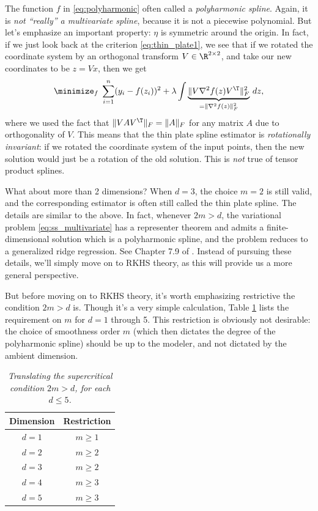 \documentclass{article}
\begin{document}
The function $f$ in \eqref{eq:polyharmonic} often called a \emph{polyharmonic
  spline}. Again, it is \emph{not ``really'' a multivariate spline}, because it
is not a piecewise polynomial. But let's emphasize an important property: $\eta$
is symmetric around the origin. In fact, if we just look back at the criterion
\eqref{eq:thin_plate1}, we see that if we rotated the coordinate system by an
orthogonal transform $V \in \R^{2 \times 2}$, and take our new coordinates to be
$z=Vx$, then we get  
\[
\minimize_f \; \sum_{i=1}^n (y_i - f(z_i))^2 + \lambda \int \underbrace{\| V
  \nabla^2 f(z) V^\T\|_F^2}_{= \|\nabla^2 f(z)\|_F^2} \, dz,   
\]
where we used the fact that $\|V A V^\T\|_F = \|A\|_F$ for any matrix $A$ due to
orthogonality of $V$. This means that the thin plate spline estimator is
\emph{rotationally invariant}: if we rotated the coordinate system of the input
points, then the new solution would just be a rotation of the old solution. This
is \emph{not} true of tensor product splines. 

What about more than 2 dimensions? When $d=3$, the choice $m=2$ is still
valid, and the corresponding estimator is often still called the thin plate
spline. The details are similar to the above. In fact, whenever $2m > d$, the 
variational problem \eqref{eq:ss_multivariate} has a representer theorem and
admits a finite-dimensional solution which is a polyharmonic spline, and the
problem reduces to a generalized ridge regression. See Chapter 7.9 of
\citet{green1993nonparametric}. Instead of pursuing these details, we'll simply
move on to RKHS theory, as this will provide us a more general perspective. 

But before moving on to RKHS theory, it's worth emphasizing restrictive the 
condition $2m > d$ is. Though it's a very simple calculation, Table
\ref{tab:supercritical} lists the requirement on $m$ for $d=1$ through 5.  
This restriction is obviously not desirable: the choice of smoothness order $m$
(which then dictates the degree of the polyharmonic spline) should be up to the
modeler, and not dictated by the ambient dimension.

\begin{table}[htb]
\centering
\begin{tabular}{c|c}
Dimension & Restriction \\
\hline
$d=1$ & $m \geq 1$ \\
$d=2$ & $m \geq 2$ \\
$d=3$ & $m \geq 2$ \\
$d=4$ & $m \geq 3$ \\
$d=5$ & $m \geq 3$ 
\end{tabular}
\caption{\it Translating the supercritical condition $2m > d$, for each $d 
  \leq 5$.} 
\label{tab:supercritical} 
\end{table}
\end{document}
